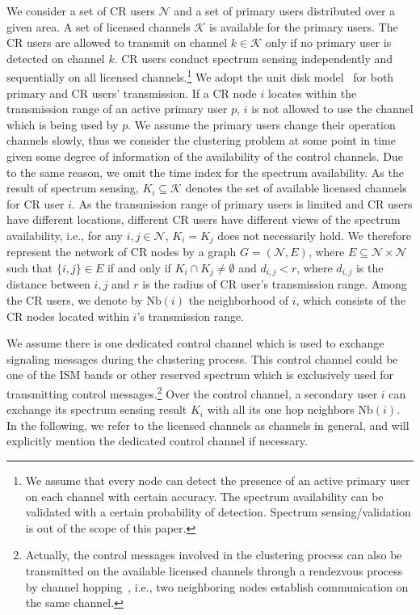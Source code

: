 \documentclass[times]{ettauth}
\theoremstyle{mytheoremstyle}
\theoremstyle{mytheoremstyle}
\theoremstyle{mytheoremstyle}
\begin{document}
We consider a set of CR users $\mathcal{N}$ and a set of primary users distributed over a given area.
A set of licensed channels $\mathcal{K}$ is available for the primary users. 
The CR users are allowed to transmit on channel $k \in \mathcal{K}$ only if no primary user is detected on channel $k$. 
CR users conduct spectrum sensing independently and sequentially on all licensed channels.\footnote{We assume that every node can detect the presence of an active primary user on each channel with certain accuracy. The spectrum availability can be validated with a certain probability of detection. Spectrum sensing/validation is out of the scope of this paper.}
We adopt the unit disk model~\cite{unitDiskModel} for both primary and CR users' transmission.
If a CR node $i$ locates within the transmission range of an active primary user $p$, $i$ is not allowed to use the channel which is being used by $p$.
We assume the primary users change their operation channels slowly, thus we consider the clustering problem at some point in time given some degree of information of the availability of the control channels.
Due to the same reason, we omit the time index for the spectrum availability. 
As the result of spectrum sensing, $K_i \subseteq \mathcal{K}$ denotes the set of available licensed channels for CR user $i$.
As the transmission range of primary users is limited and CR users have different locations, different CR users have different views of the spectrum availability, i.e., for any $i, j \in \mathcal{N}$, $K_i = K_{j}$ does not necessarily hold.
We therefore represent the network of CR nodes by a graph $G = (\mathcal{N}, E)$, where $E \subseteq \mathcal{N} \times \mathcal{N}$ such that $\{i, j\} \in E$ if and only if $K_{i} \cap K_{j}\neq \emptyset$ and $d_{i,j} < r$, where $d_{i,j}$ is the distance between $i, j$ and $r$ is the radius of CR user's transmission range. 
%
Among the CR users, we denote by $\text{Nb}(i)$ the neighborhood of $i$, which consists of the CR nodes located within $i$'s transmission range. 

We assume there is one dedicated control channel which is used to exchange signaling messages during the clustering process.
This control channel could be one of the ISM bands or other reserved spectrum which is exclusively used for transmitting control messages.\footnote{Actually, the control messages involved in the clustering process can also be transmitted on the available licensed channels through a rendezvous process by channel hopping~\cite{channelHopping_Rendezvous_2014, Gu_distributed_rendezvous_2014}, i.e., two neighboring nodes establish communication on the same channel.}
Over the control channel, a secondary user $i$ can exchange its spectrum sensing result $K_i$ with all its one hop neighbors $\text{Nb}(i)$.
In the following, we refer to the licensed channels as channels in general, and will explicitly mention the dedicated control channel if necessary. 
\end{document}
